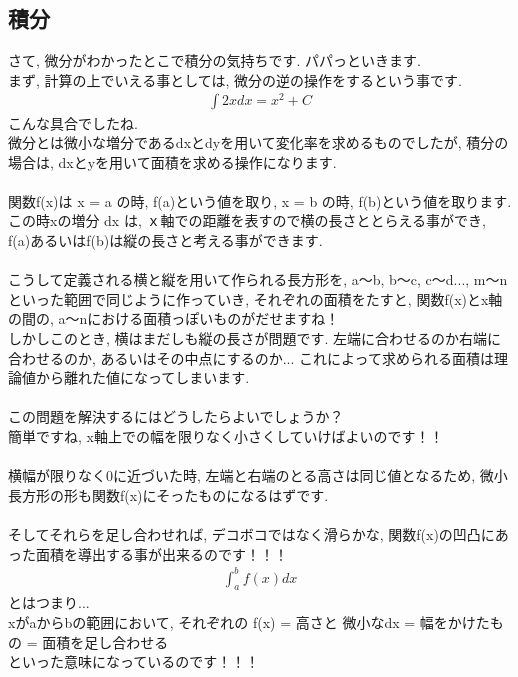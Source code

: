 \documentclass[11pt,a4paper]{jreport}
\begin{document}
\subsection{積分}
さて, 微分がわかったとこで積分の気持ちです. パパっといきます.\\
まず, 計算の上でいえる事としては, 微分の逆の操作をするという事です.
\begin{eqnarray}
\int 2x dx= x^2 + C
\end{eqnarray}
こんな具合でしたね. \\
微分とは微小な増分であるdxとdyを用いて変化率を求めるものでしたが, 積分の場合は, dxとyを用いて面積を求める操作になります.\\
\\
関数f(x)は x = a の時, f(a)という値を取り, x = b の時, f(b)という値を取ります. この時xの増分 dx は, ｘ軸での距離を表すので横の長さととらえる事ができ, f(a)あるいはf(b)は縦の長さと考える事ができます.\\
\\
こうして定義される横と縦を用いて作られる長方形を, a～b, b～c, c～d..., m～nといった範囲で同じように作っていき, それぞれの面積をたすと, 関数f(x)とx軸の間の, a～nにおける面積っぽいものがだせますね！\\
しかしこのとき, 横はまだしも縦の長さが問題です. 左端に合わせるのか右端に合わせるのか, あるいはその中点にするのか... これによって求められる面積は理論値から離れた値になってしまいます.\\
\\
この問題を解決するにはどうしたらよいでしょうか？\\
簡単ですね, x軸上での幅を限りなく小さくしていけばよいのです！！\\
\\
横幅が限りなく0に近づいた時, 左端と右端のとる高さは同じ値となるため, 微小長方形の形も関数f(x)にそったものになるはずです.\\
\\
そしてそれらを足し合わせれば, デコボコではなく滑らかな, 関数f(x)の凹凸にあった面積を導出する事が出来るのです！！！
\begin{eqnarray}
\int_a^b f(x) dx
\end{eqnarray}
とはつまり...\\
xがaからbの範囲において, それぞれの f(x) = 高さと 微小なdx = 幅をかけたもの = 面積を足し合わせる\\
といった意味になっているのです！！！\\
\end{document}
